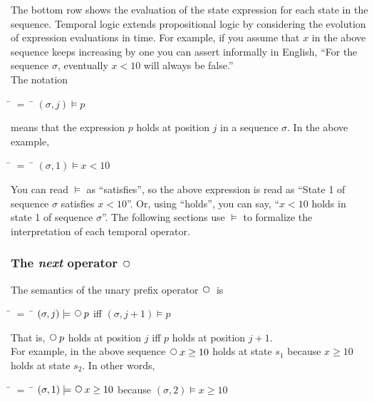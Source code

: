 \documentclass[fleqn, leqno]{article}
\newcommand{\mymathindent}{24pt}                    %
\newcommand{\Next}{\;\,\text{\raisebox{3.5pt}{\circle{6}}}}
\begin{document}
The bottom row shows the evaluation of the state expression for each state in the sequence.
Temporal logic extends propositional logic by considering the evolution of expression evaluations in time.
For example, if you assume that $x$ in the above sequence keeps increasing by one you can assert
informally in English, ``For the sequence $\sigma$, eventually $x<10$ will always be false.''\\

The notation

\begin{tabbing}
\hspace{\mymathindent} \= $= \;$ \= \kill
  \> $(\sigma, j) \models p$
\end{tabbing}

means that the expression $p$ holds at position $j$ in a sequence $\sigma$.
In the above example,

\begin{tabbing}
\hspace{\mymathindent} \= $= \;$ \= \kill
  \> $(\sigma, 1) \models x<10$
\end{tabbing}

You can read $\models$ as ``satisfies'', so the above expression is read as
``State 1 of sequence $\sigma$ satisfies $x<10$''.
Or, using ``holds'', you can say, ``$x<10$ holds in state 1 of sequence $\sigma$''.
The following sections use $\models$ to formalize the interpretation of each temporal operator.

\subsubsection*{The \textit{next} operator $\Next$}

The semantics of the unary prefix operator $\Next$ is

\begin{tabbing}
\hspace{\mymathindent} \= $= \;$ \= \kill
  \> $(\sigma, j) \models \Next p$ \quad iff \quad $(\sigma, j+1) \models p$
\end{tabbing}

That is, $\Next p$ holds at position $j$ iff $p$ holds at position $j+1$.\\

For example, in the above sequence $\Next x \ge 10$ holds at state $s_1$ because $x \ge 10$
holds at state $s_2$.
In other words,

\begin{tabbing}
\hspace{\mymathindent} \= $= \;$ \= \kill
  \> $(\sigma, 1) \models \Next x \ge 10$ \quad because \quad $(\sigma, 2) \models  x \ge 10$
\end{tabbing}
\end{document}
